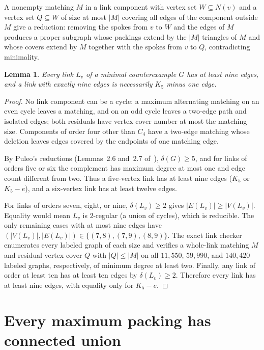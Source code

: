\documentclass[11pt]{article}
\newtheorem{lemma}[theorem]{Lemma}
\begin{document}
A nonempty matching $M$ in a link component with vertex set $W\subseteq N(v)$ and a vertex set $Q\subseteq W$ of size at most $|M|$ covering all edges of the component outside $M$ give a reduction: removing the spokes from $v$ to $W$ and the edges of $M$ produces a proper subgraph whose packings extend by the $|M|$ triangles of $M$ and whose covers extend by $M$ together with the spokes from $v$ to $Q$, contradicting minimality.

\begin{lemma}\label{lem:min-nine-edges}
Every link $L_v$ of a minimal counterexample $G$ has at least nine edges, and a link with exactly nine edges is necessarily $K_5$ minus one edge.
\end{lemma}

\begin{proof}
No link component can be a cycle: a maximum alternating matching on an even cycle leaves a matching, and on an odd cycle leaves a two-edge path and isolated edges; both residuals have vertex cover number at most the matching size. Components of order four other than $C_4$ have a two-edge matching whose deletion leaves edges covered by the endpoints of one matching edge.

By Puleo's reductions (Lemmas~2.6 and~2.7 of~\cite{Puleo}), $\delta(G)\geq 5$, and for links of orders five or six the complement has maximum degree at most one and edge count different from two. Thus a five-vertex link has at least nine edges ($K_5$ or $K_5-e$), and a six-vertex link has at least twelve edges.

For links of orders seven, eight, or nine, $\delta(L_v)\geq 2$ gives $|E(L_v)|\geq |V(L_v)|$. Equality would mean $L_v$ is $2$-regular (a union of cycles), which is reducible. The only remaining cases with at most nine edges have $(|V(L_v)|,|E(L_v)|)\in\{(7,8),(7,9),(8,9)\}$. The exact link checker~\cite{SmallLinks} enumerates every labeled graph of each size and verifies a whole-link matching $M$ and residual vertex cover $Q$ with $|Q|\leq |M|$ on all $11{,}550$, $59{,}990$, and $140{,}420$ labeled graphs, respectively, of minimum degree at least two. Finally, any link of order at least ten has at least ten edges by $\delta(L_v)\geq 2$. Therefore every link has at least nine edges, with equality only for $K_5-e$.
\end{proof}

\section{Every maximum packing has connected union}
\end{document}
